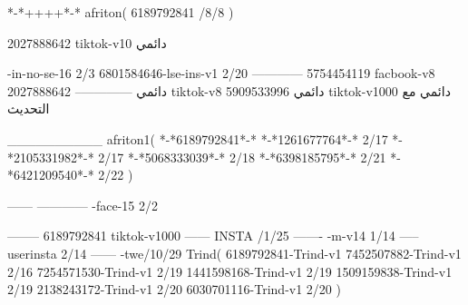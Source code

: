 *-*++++*-*
afriton(
6189792841 /8/8
)

2027888642 tiktok-v10
دائمي

-in-no-se-16 2/3
6801584646-lse-ins-v1 2/20
------------
5754454119 facbook-v8
دائمي
--------------
2027888642 tiktok-v8
دائمي
5909533996 tiktok-v1000
دائمي مع التحديث

__________
afriton1(
*-*6189792841*-*
*-*1261677764*-* 2/17
*-*2105331982*-* 2/17
*-*5068333039*-* 2/18
*-*6398185795*-* 2/21
*-*6421209540*-* 2/22
)

------
------------
-face-15 2/2

--------
6189792841 tiktok-v1000
------
 INSTA /1/25
-------
-m-v14 1/14
-----
userinsta 2/14
------
-twe/10/29
Trind(
6189792841-Trind-v1 
7452507882-Trind-v1 2/16
7254571530-Trind-v1 2/19
1441598168-Trind-v1 2/19
1509159838-Trind-v1 2/19
2138243172-Trind-v1 2/20
6030701116-Trind-v1 2/20
)
